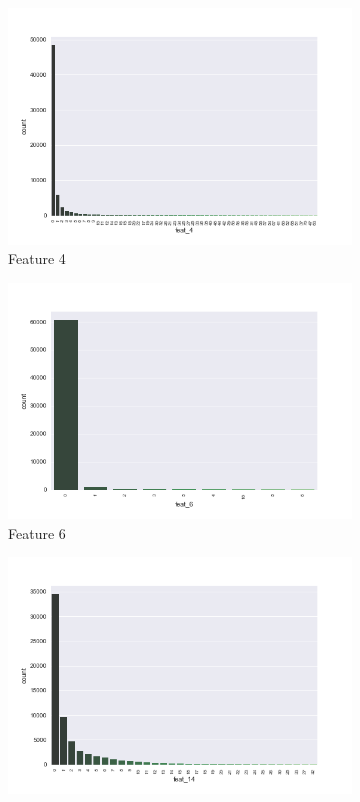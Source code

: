 \documentclass[a4paper,english,12pt, twocolumn]{article}
\begin{document}
\begin{figure}[H]
	\centering
	\begin{subfigure}{0.22\textwidth}
		\includegraphics[width=\textwidth]{feat_4}
		\caption{Feature 4}
	\end{subfigure}
	\begin{subfigure}{0.22\textwidth}
		\includegraphics[width=\textwidth]{feat_6}
		\caption{Feature 6}
	\end{subfigure}
	\begin{subfigure}{0.22\textwidth}
		\includegraphics[width=\textwidth]{feat_14}

\end{subfigure}
\end{figure}
\end{document}
